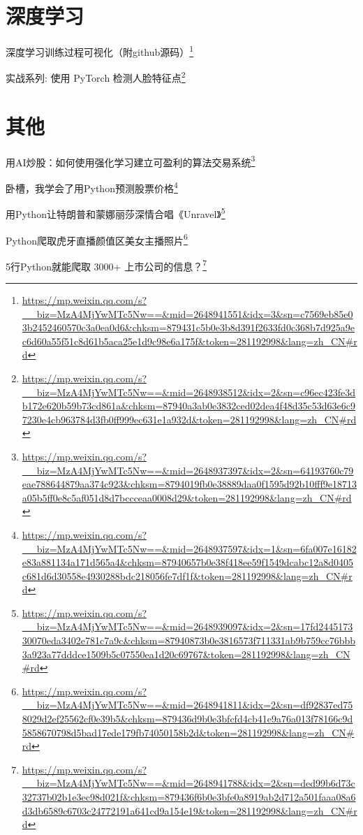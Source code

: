 \documentclass[]{ctexbook}
\renewcommand{\href}[2]{#2\footnote{\url{#1}}}
\begin{document}
\hypertarget{ux6df1ux5ea6ux5b66ux4e60}{%
\section{深度学习}\label{ux6df1ux5ea6ux5b66ux4e60}}

\href{https://mp.weixin.qq.com/s?__biz=MzA4MjYwMTc5Nw==\&mid=2648941551\&idx=3\&sn=c7569eb85e03b2452460570c3a0ea0d6\&chksm=879431c5b0e3b8d391f2633fd0c368b7d925a9ec6d60a55f51c8d61b5aca25e1d9c98e6a175f\&token=281192998\&lang=zh_CN\#rd}{深度学习训练过程可视化（附github源码）}

\href{https://mp.weixin.qq.com/s?__biz=MzA4MjYwMTc5Nw==\&mid=2648938512\&idx=2\&sn=c96ec423fe3db172e620b59b73cd861a\&chksm=87940a3ab0e3832ced02dea4f48d35c53d63e6c97230e4cb963784d3fb0ff999ec631e1a932d\&token=281192998\&lang=zh_CN\#rd}{实战系列: 使用 PyTorch 检测人脸特征点}

\hypertarget{ux5176ux4ed6-2}{%
\section{其他}\label{ux5176ux4ed6-2}}

\href{https://mp.weixin.qq.com/s?__biz=MzA4MjYwMTc5Nw==\&mid=2648937397\&idx=2\&sn=64193760c79eae788644879aa374c923\&chksm=8794019fb0e38889daa0f1595d92b10fff9e18713a05b5ff0e8c5af051d8d7bccceaa0008d29\&token=281192998\&lang=zh_CN\#rd}{用AI炒股：如何使用强化学习建立可盈利的算法交易系统}

\href{https://mp.weixin.qq.com/s?__biz=MzA4MjYwMTc5Nw==\&mid=2648937597\&idx=1\&sn=6fa007e16182e83a881134a171d565a4\&chksm=87940657b0e38f418ee59f1549dcabc12a8d0405c681d6d30558e4930288bdc218056fe7df1f\&token=281192998\&lang=zh_CN\#rd}{卧槽，我学会了用Python预测股票价格}

\href{https://mp.weixin.qq.com/s?__biz=MzA4MjYwMTc5Nw==\&mid=2648939097\&idx=2\&sn=17fd244517330070eda3402e781c7a9c\&chksm=87940873b0e3816573f711331ab9b759cc76bbb3a923a77dddce1509b5c07550ea1d20c69767\&token=281192998\&lang=zh_CN\#rd}{用Python让特朗普和蒙娜丽莎深情合唱《Unravel》}

\href{https://mp.weixin.qq.com/s?__biz=MzA4MjYwMTc5Nw==\&mid=2648941811\&idx=2\&sn=df92837ed758029d2ef25562cf0e39b5\&chksm=879436d9b0e3bfcfd4cb41e9a76a013f78166c9d5858670798d5bad17ede179fb74050158b2d\&token=281192998\&lang=zh_CN\#rd}{Python爬取虎牙直播颜值区美女主播照片}

\href{https://mp.weixin.qq.com/s?__biz=MzA4MjYwMTc5Nw==\&mid=2648941788\&idx=2\&sn=ded99b6d73c32737b02b1e3ec98d021f\&chksm=879436f6b0e3bfe0a8919ab2d712a501faaa08a6d3db6589c6703c24772191a641cd9a154e19\&token=281192998\&lang=zh_CN\#rd}{5行Python就能爬取 3000+ 上市公司的信息？}
\end{document}
